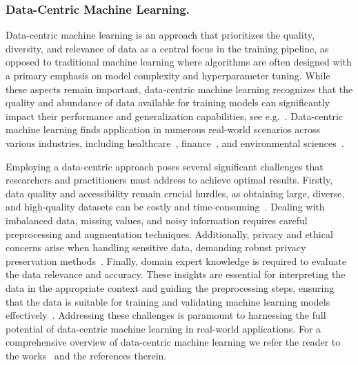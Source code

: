 \documentclass[letterpaper]{article} %
\begin{document}
\subsubsection{Data-Centric Machine Learning.}
Data-centric machine learning is an approach that prioritizes the quality, diversity, and relevance of data as a central focus in the training pipeline, as opposed to traditional machine learning where algorithms are often designed with a primary emphasis on model complexity and hyperparameter tuning.
While these aspects remain important, data-centric machine learning recognizes that the quality and abundance of data available for training models can significantly impact their performance and generalization capabilities, see e.g.~\cite{pan2022data, majeed2023data}.
Data-centric machine learning finds application in numerous real-world scenarios across various industries, including healthcare~\cite{zahid2021systematic, emmert2022digital, dritsas2022data}, finance~\cite{liu2022finrl, horvatha2023harnessing}, and environmental sciences~\cite{devarajan2021dlio, li2022big}.

Employing a data-centric approach poses several significant challenges that researchers and practitioners must address to achieve optimal results.
Firstly, data quality and accessibility remain crucial hurdles, as obtaining large, diverse, and high-quality datasets can be costly and time-consuming~\cite{roh2019survey}.
Dealing with imbalanced data, missing values, and noisy information requires careful preprocessing and augmentation techniques.
Additionally, privacy and ethical concerns arise when handling sensitive data, demanding robust privacy preservation methods~\cite{jo2020lessons}.
Finally, domain expert knowledge is required to evaluate the data relevance and accuracy.
These insights are essential for interpreting the data in the appropriate context and guiding the preprocessing steps, ensuring that the data is suitable for training and validating machine learning models effectively~\cite{gennatas2020expert}.
Addressing these challenges is paramount to harnessing the full potential of data-centric machine learning in real-world applications.
For a comprehensive overview of data-centric machine learning we refer the reader to the works~\cite{anik2021data, miranda2021towards, seedat2022dc, zha2023data} and the references therein.
\end{document}
